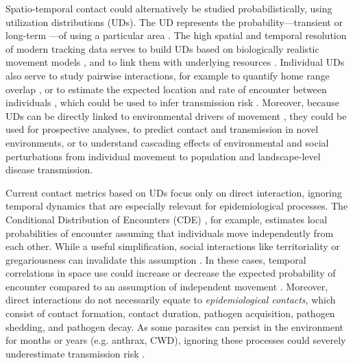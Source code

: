 \documentclass[letterpaper]{article}
\begin{document}
Spatio-temporal contact could alternatively be studied probabilistically, using utilization distributions (UDs). The UD represents the probability---transient or long-term \citep{Tao2016}---of using a particular area \citep{Worton1989}. The high spatial and temporal resolution of modern tracking data serves to build UDs based on biologically realistic movement models \citep{Kranstauber2012,Fleming2014}, and to link them with underlying resources \citep{Potts2023}.
Individual UDs also serve to study pairwise interactions, for example to quantify home range overlap \citep{Winner2018}, or to estimate the expected location and rate of encounter between individuals \citep{Noonan2021}, which could be used to infer transmission risk \citep{Godfrey2010, Godfrey2013,Noonan2021}. 
Moreover, because UDs can be directly linked to environmental drivers of movement \citep{Signer2017}, they could be used for prospective analyses, to predict contact and transmission in novel environments, or to understand cascading effects of environmental and social perturbations from individual movement to population and landscape-level disease transmission. 

Current contact metrics based on UDs focus only on direct interaction, ignoring temporal dynamics that are especially relevant for epidemiological processes. The Conditional Distribution of Encounters (CDE) \citep{Noonan2021}, for example, estimates local probabilities of encounter assuming that individuals move independently from each other.
While a useful simplification, social interactions like territoriality or gregariousness can invalidate this assumption \citep{Manlove2018,Sah2018}. In these cases, temporal correlations in space use could increase or decrease the expected probability of encounter compared to an assumption of independent movement \citep{Kjaer2008,Schauber2015a}. 
Moreover, direct interactions do not necessarily equate to \emph{epidemiological contacts}, which consist of contact formation, contact duration, pathogen acquisition, pathogen shedding, and pathogen decay. As some parasites can persist in the environment for months or years (e.g. anthrax, CWD), ignoring these processes could severely underestimate transmission risk \citep{Wilber2022,Yang2023,Richardson2015}.
\end{document}
